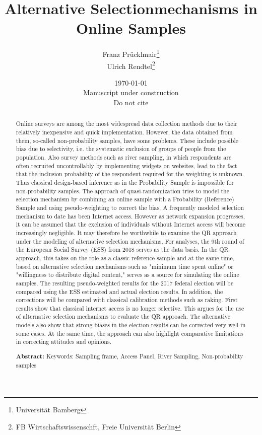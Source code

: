 \documentclass[a4paper , 11pt]{article}
\title{Alternative Selectionmechanisms in Online Samples}
\author  {Franz Prücklmair\thanks{Universität Bamberg} \\ Ulrich Rendtel\thanks{FB Wirtschaftswissenschft, Freie Universität Berlin} 
        }
\date{ \today\\Manuscript under construction\\ Do not cite}
\begin{document}
\maketitle
\tableofcontents
\newpage
\begin{abstract}


Online surveys are among the most widespread data collection methods due to their relatively inexpensive and quick implementation. However, the data obtained from them, so-called non-probability samples, have some problems. These include possible bias due to selectivity, i.e. the systematic exclusion of groups of people from the population. Also survey methods such as river sampling, in which respondents are often recruited uncontrollably by implementing widgets on websites, lead to the fact that the inclusion probability of the respondent required for the weighting is unknown. Thus classical design-based inference as in the Probability Sample is impossible for non-probability samples.
The approach of quasi-randomization tries to model the selection mechanism by combining an online sample with a Probability (Reference) Sample and using pseudo-weighting to correct the bias. A frequently modeled selection mechanism to date has been Internet access. However as network expansion progresses, it can be assumed that the exclusion of individuals without Internet access will become increasingly negligible. It may therefore be worthwhile to examine the QR approach under the modeling of alternative selection mechanisms.
For analyses, the 9th round of the European Social Survey (ESS) from 2018 serves as the data basis. In the QR approach, this takes on the role as a classic reference sample and at the same time, based on alternative selection mechanisms such as "minimum time spent online" or "willingness to distribute digital content," serves as a source for simulating the online samples. The resulting pseudo-weighted results for the 2017 federal election will be compared using the ESS estimated and actual election results. In addition, the corrections will be compared with classical calibration methods such as raking.
First results show that classical internet access is no longer selective. This argues for the use of alternative selection mechanisms to evaluate the QR approach. The alternative models also show that strong biases in the election results can be corrected very well in some cases. At the same time, the approach can also highlight comparative limitations in correcting attitudes and opinions. 



\begin{center}
  \textbf{Abstract:} Keywords: Sampling frame, Access Panel, River Sampling, Non-probability samples
\end{center}



\end{abstract}
\newpage
\end{document}
